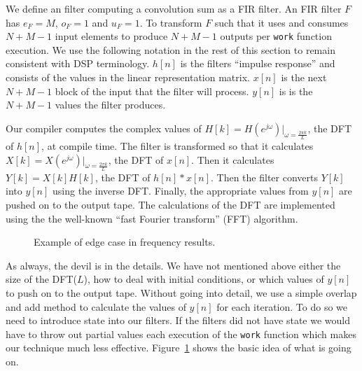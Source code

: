 We define an filter computing a convolution sum as a FIR filter. An FIR filter $F$ has
$e_F=M$, $o_F=1$ and $u_F=1$. To transform $F$ such that it uses and consumes $N+M-1$ input
elements to produce $N+M-1$ outputs per {\tt work} function execution. We use the 
following notation in the rest of this section to remain consistent with DSP terminology.
$h[n]$ is the filters ``impulse response'' and consists of the values in the linear 
representation matrix. $x[n]$ is the next $N+M-1$ block of the input that the filter
will process. $y[n]$ is is the $N+M-1$ values the filter produces.

Our compiler computes the complex values of $H[k]=H(e^{j\omega})|_{\omega=\frac{2{\pi}k}{L}}$, 
the DFT of $h[n]$, at compile time. The filter is transformed 
so that it  calculates $X[k]=X(e^{j\omega})|_{\omega=\frac{2{\pi}k}{L}}$, the DFT 
of $x[n]$. Then it calculates $Y[k]=X[k]H[k]$, the DFT of $h[n]*x[n]$.
Then the filter converts $Y[k]$ into $y[n]$ using the inverse DFT. Finally, 
the appropriate values from $y[n]$ are pushed on to the output tape. The
calculations of the DFT are implemented using the the well-known 
``fast Fourier transform'' (FFT) algorithm.

\begin{figure}
\center
\epsfxsize=3.0in
\caption{Example of edge case in frequency results.}
\label{fig:frequency-example}
\end{figure}

As always, the devil is in the details. We have not mentioned above either 
the size of the DFT($L$), how to deal with initial conditions, or which 
values of $y[n]$ to push on to the output tape. 
Without going into detail, we use a simple overlap and add\cite{oppenheim-discrete} 
method to calculate the values of $y[n]$ for each iteration. To do so 
we need to introduce state into our filters. If the filters did not have state
we would have to throw out partial values each execution of the {\tt work} function
which makes our technique much less effective. Figure~\ref{fig:frequency-example} shows
the basic idea of what is going on.


